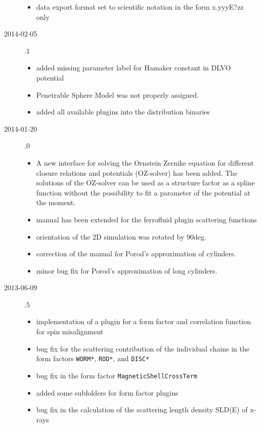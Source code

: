 \begin{description}
\begin{itemize}
        \item data export format set to scientific notation in the form x.yyyE?zz only
    \end{itemize}
    \item[2014-02-05] .1
    \begin{itemize}
      \item added missing parameter label for Hamaker constant in DLVO potential
      \item Penetrable Sphere Model was not properly assigned.
      \item added all available plugins into the distribution binaries
    \end{itemize}
    \item[2014-01-20] .0
    \begin{itemize}
      \item A new interface for solving the Ornstein Zernike equation for different
            closure relations and potentials (OZ-solver) has been added. The solutions
            of the OZ-solver can be used as a structure factor as a spline function without the possibility to fit a parameter of the potential at the moment.
      \item manual has been extended for the ferrofluid plugin scattering functions
      \item orientation of the 2D simulation was rotated by 90deg.
      \item correction of the manual for Porod's approximation of cylinders.
      \item minor bug fix for Porod's approximation of long cylinders.
    \end{itemize}
    \item[2013-06-09] .5
    \begin{itemize}
      \item implementation of a plugin for a form factor and correlation function for spin misalignment
      \item  bug fix for the scattering contribution of the individual chains in the form factors \texttt{WORM*}, \texttt{ROD*}, and \texttt{DISC*}
      \item  bug fix in the form factor \texttt{MagneticShellCrossTerm}
      \item added some subfolders for form factor plugins
      \item bug fix in the calculation of the scattering length density SLD(E) of x-rays
    \end{itemize}

\end{description}
